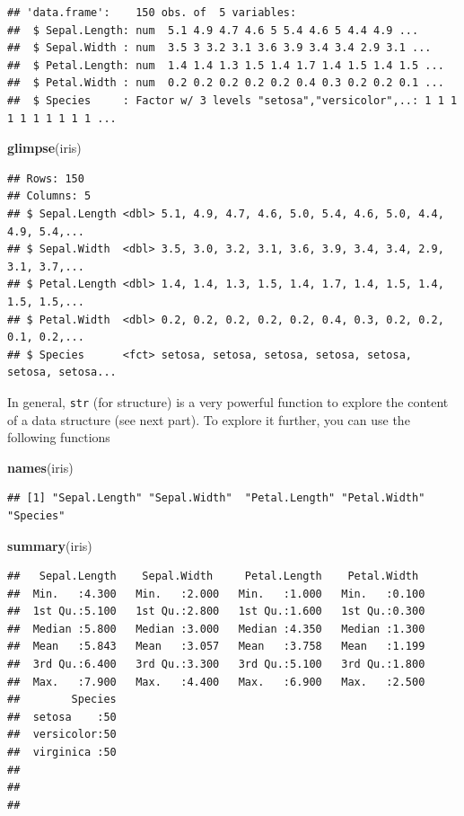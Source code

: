 \documentclass[
]{book}
\newenvironment{Shaded}{\begin{snugshade}}{\end{snugshade}}
\newcommand{\KeywordTok}[1]{\textcolor[rgb]{0.13,0.29,0.53}{\textbf{#1}}}
\newcommand{\NormalTok}[1]{#1}
\begin{document}
\begin{verbatim}
## 'data.frame':	150 obs. of  5 variables:
##  $ Sepal.Length: num  5.1 4.9 4.7 4.6 5 5.4 4.6 5 4.4 4.9 ...
##  $ Sepal.Width : num  3.5 3 3.2 3.1 3.6 3.9 3.4 3.4 2.9 3.1 ...
##  $ Petal.Length: num  1.4 1.4 1.3 1.5 1.4 1.7 1.4 1.5 1.4 1.5 ...
##  $ Petal.Width : num  0.2 0.2 0.2 0.2 0.2 0.4 0.3 0.2 0.2 0.1 ...
##  $ Species     : Factor w/ 3 levels "setosa","versicolor",..: 1 1 1 1 1 1 1 1 1 1 ...
\end{verbatim}

\begin{Shaded}
\begin{Highlighting}[]
\KeywordTok{glimpse}\NormalTok{(iris)}
\end{Highlighting}
\end{Shaded}

\begin{verbatim}
## Rows: 150
## Columns: 5
## $ Sepal.Length <dbl> 5.1, 4.9, 4.7, 4.6, 5.0, 5.4, 4.6, 5.0, 4.4, 4.9, 5.4,...
## $ Sepal.Width  <dbl> 3.5, 3.0, 3.2, 3.1, 3.6, 3.9, 3.4, 3.4, 2.9, 3.1, 3.7,...
## $ Petal.Length <dbl> 1.4, 1.4, 1.3, 1.5, 1.4, 1.7, 1.4, 1.5, 1.4, 1.5, 1.5,...
## $ Petal.Width  <dbl> 0.2, 0.2, 0.2, 0.2, 0.2, 0.4, 0.3, 0.2, 0.2, 0.1, 0.2,...
## $ Species      <fct> setosa, setosa, setosa, setosa, setosa, setosa, setosa...
\end{verbatim}

In general, \texttt{str} (for structure) is a very powerful function to explore the content of a data structure (see next part). To explore it further, you can use the following functions

\begin{Shaded}
\begin{Highlighting}[]
\KeywordTok{names}\NormalTok{(iris)}
\end{Highlighting}
\end{Shaded}

\begin{verbatim}
## [1] "Sepal.Length" "Sepal.Width"  "Petal.Length" "Petal.Width"  "Species"
\end{verbatim}

\begin{Shaded}
\begin{Highlighting}[]
\KeywordTok{summary}\NormalTok{(iris)}
\end{Highlighting}
\end{Shaded}

\begin{verbatim}
##   Sepal.Length    Sepal.Width     Petal.Length    Petal.Width   
##  Min.   :4.300   Min.   :2.000   Min.   :1.000   Min.   :0.100  
##  1st Qu.:5.100   1st Qu.:2.800   1st Qu.:1.600   1st Qu.:0.300  
##  Median :5.800   Median :3.000   Median :4.350   Median :1.300  
##  Mean   :5.843   Mean   :3.057   Mean   :3.758   Mean   :1.199  
##  3rd Qu.:6.400   3rd Qu.:3.300   3rd Qu.:5.100   3rd Qu.:1.800  
##  Max.   :7.900   Max.   :4.400   Max.   :6.900   Max.   :2.500  
##        Species  
##  setosa    :50  
##  versicolor:50  
##  virginica :50  
##                 
##                 
## 
\end{verbatim}
\end{document}
